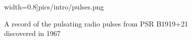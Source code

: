 \begin{figure}[h]
width=0.8\textwidth]{pics/intro/pulses.png}
  \caption[A record of pulsating radio source]{A record of the pulsating radio
    pulses from PSR B1919+21 discovered in 1967 \citep{1969Natur.224..472H}}
  \label{fig:pulse}
\end{figure}
%

